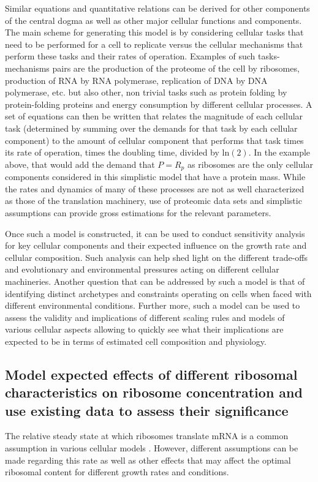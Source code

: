 \documentclass[notitlepage]{article}
\begin{document}
Similar equations and quantitative relations can be derived for other components of the central dogma as well as other major cellular functions and components.
The main scheme for generating this model is by considering cellular tasks that need to be performed for a cell to replicate versus the cellular mechanisms that perform these tasks and their rates of operation.
Examples of such tasks-mechanisms pairs are the production of the proteome of the cell by ribosomes, production of RNA by RNA polymerase, replication of DNA by DNA polymerase, etc. but also other, non trivial tasks such as protein folding by protein-folding proteins and energy consumption by different cellular processes.
A set of equations can then be written that relates the magnitude of each cellular task (determined by summing over the demands for that task by each cellular component) to the amount of cellular component that performs that task times its rate of operation, times the doubling time, divided by $\text{ln}(2)$.
In the example above, that would add the demand that $P=R_p$ as ribosomes are the only cellular components considered in this simplistic model that have a protein mass.
While the rates and dynamics of many of these processes are not as well characterized as those of the translation machinery, use of proteomic data sets and simplistic assumptions can provide gross estimations for the relevant parameters.

Once such a model is constructed, it can be used to conduct sensitivity analysis for key cellular components and their expected influence on the growth rate and cellular composition.
Such analysis can help shed light on the different trade-offs and evolutionary and environmental pressures acting on different cellular machineries.
Another question that can be addressed by such a model is that of identifying distinct archetypes and constraints operating on cells when faced with different environmental conditions.
Further more, such a model can be used to assess the validity and implications of different scaling rules and models of various cellular aspects allowing to quickly see what their implications are expected to be in terms of estimated cell composition and physiology.

\subsection{Model expected effects of different ribosomal characteristics on ribosome concentration and use existing data to assess their significance}
The relative steady state at which ribosomes translate mRNA is a common assumption in various cellular models \cite{Scott2010}.
However, different assumptions can be made regarding this rate as well as other effects that may affect the optimal ribosomal content for different growth rates and conditions.
\end{document}
